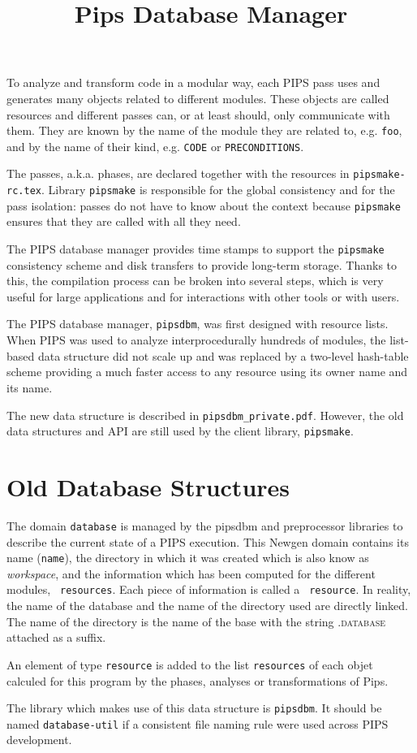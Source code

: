 \documentclass[a4paper]{article}
\title{Pips Database Manager}
\begin{document}
\maketitle

To analyze and transform code in a modular way, each PIPS pass uses
and generates many objects related to different modules. These objects
are called resources and different passes can, or at least should,
only communicate with them. They are known by the name of the module
they are related to, e.g. \verb/foo/, and by the name of their kind,
e.g. \verb/CODE/ or \verb/PRECONDITIONS/.

The passes, a.k.a. phases, are declared together with the resources in
\verb/pipsmake-rc.tex/. Library \verb/pipsmake/ is responsible for the
global consistency and for the pass isolation: passes do not have to
know about the context because \verb/pipsmake/ ensures that they are
called with all they need.

The PIPS database manager provides time stamps to support the
\verb/pipsmake/ consistency scheme and disk transfers to provide
long-term storage. Thanks to this, the compilation process can be
broken into several steps, which is very useful for large applications
and for interactions with other tools or with users.

The PIPS database manager, \verb/pipsdbm/, was first designed with
resource lists. When PIPS was used to analyze interprocedurally
hundreds of modules, the list-based data structure did not scale up
and was replaced by a two-level hash-table scheme providing a much
faster access to any resource using its owner name and its name.

The new data structure is described in
\verb/pipsdbm_private.pdf/. However, the old data structures and API
are still used by the client library, \verb/pipsmake/.

\section{Old Database Structures}
 
{ The domain {\tt database} is managed by the pipsdbm and preprocessor libraries
  to describe the current state of a PIPS execution. This Newgen domain contains its
  name ({\tt name}), the directory in which it was created which is
  also know as {\em workspace}, and the
  information which has been computed for the different modules, {\tt
    resources}. Each
  piece of information is called a {\tt
    resource}. In reality, the name of the database and the name of the
  directory used are directly linked. The name of the
  directory is the name of the base with the string \textsc{.database}
  attached as a suffix.
 
An element of type {\tt resource} is added to the list {\tt resources}
of each objet calculed for this program by the phases, analyses or
transformations of Pips.
 
The library which makes use of this data structure is
\texttt{pipsdbm}. It should be named \texttt{database-util} if a
consistent file naming rule were used across PIPS development.
 
}
\end{document}
